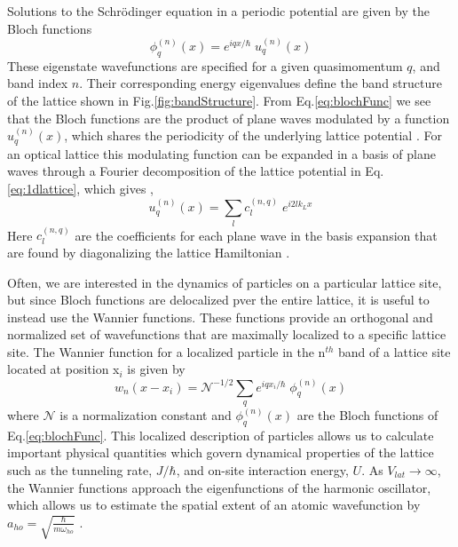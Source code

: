 	
Solutions to the Schr\"{o}dinger equation in a periodic potential are given by the Bloch functions \cite{Ashcroft1976}
	\begin{equation} \label{eq:blochFunc}
		 \phi_q^{(n)}(x) = e^{iqx/ \hbar} \; u_q^{(n)}(x)
	\end{equation}
These eigenstate wavefunctions are specified for a given quasimomentum $q$, and band index $n$. Their corresponding energy eigenvalues define the band structure of the lattice shown in Fig.\;\ref{fig:bandStructure}. From Eq.\;\ref{eq:blochFunc} we see that the Bloch functions are the product of plane waves modulated by a function $u_q^{(n)}(x)$, which shares the periodicity of the underlying lattice potential \cite{Ashcroft1976}. For an optical lattice this modulating function can be expanded in a basis of plane waves through a Fourier decomposition of the lattice potential in Eq.\;\ref{eq:1dlattice}, which gives \cite{Greiner2003},
	\begin{equation} \label{eq:blochMod}
		 u_q^{(n)}(x) = \sum_l c_l^{(n,q)} \; e^{i2lk_Lx}
	\end{equation}
Here $c_l^{(n,q)}$ are the coefficients for each plane wave in the basis expansion that are found by diagonalizing the lattice Hamiltonian \cite{Greiner2003}.

Often, we are interested in the dynamics of particles on a particular lattice site, but since Bloch functions are delocalized pver the entire lattice, it is useful to instead use the Wannier functions. These functions provide an orthogonal and normalized set of wavefunctions that are maximally localized to a specific lattice site. The Wannier function for a localized particle in the n$^{th}$ band of a lattice site located at position x$_i$ is given by \cite{Jaksch2005}
	\begin{equation} \label{eq:wannier}
		 w_{n}(x - x_i) = \mathcal{N}^{-1/2} \sum_q e^{iqx_i/ \hbar} \; \phi_q^{(n)}(x)
	\end{equation}
where $\mathcal{N}$ is a normalization constant and $\phi_q^{(n)}(x)$ are the Bloch functions of Eq.\;\ref{eq:blochFunc}. This localized description of particles allows us to calculate important physical quantities which govern dynamical properties of the lattice such as the tunneling rate, $J/ \hbar$, and on-site interaction energy, $U$.  As $V_{lat}\!\rightarrow\!\infty$, the Wannier functions approach the eigenfunctions of the harmonic oscillator, which allows us to estimate the spatial extent of an atomic wavefunction by $a_{ho} = \sqrt{\frac{\hbar}{m \omega_{ho}}}$ \cite{Jaksch2005}. 

